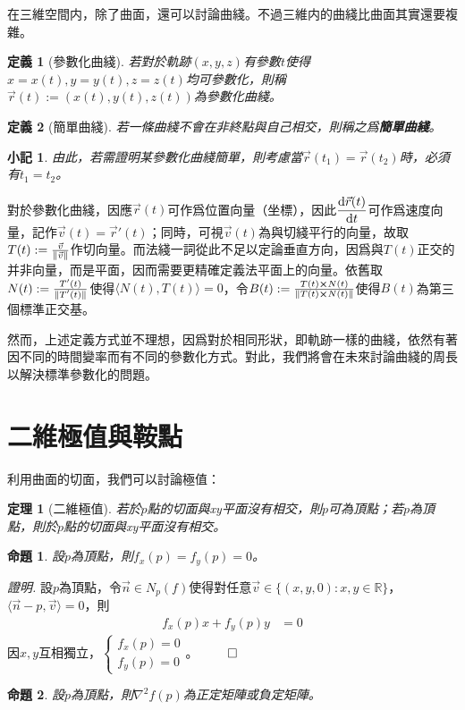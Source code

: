 \documentclass[12pt]{article}
\newcommand{\innerprod}[2]{\langle{#1},{#2}\rangle}
\newtheorem{definition}{定義}
\newtheorem*{theorem}{定理}
\newtheorem*{proposition}{命題}
\newtheorem*{remark}{小記}
\renewenvironment*{proof}{\textit{證明.}}{\hfill$\qed$}
\begin{document}
    在三維空間内，除了曲面，還可以討論曲綫。不過三維内的曲綫比曲面其實還要複雜。

    \begin{definition}[參數化曲綫]
        若對於軌跡$(x,y,z)$有參數$t$使得$x=x(t),y=y(t),z=z(t)$均可參數化，則稱$\vec{r}(t):=(x(t),y(t),z(t))$為參數化曲綫。
    \end{definition}

    \begin{definition}[簡單曲綫]
        若一條曲綫不會在非終點與自己相交，則稱之爲\textbf{簡單曲綫}。
    \end{definition}

    \begin{remark}
        由此，若需證明某參數化曲綫簡單，則考慮當$\vec{r}(t_1)=\vec{r}(t_2)$時，必須有$t_1=t_2$。
    \end{remark}

    對於參數化曲綫，因應$\vec{r}(t)$可作爲位置向量（坐標），因此$\displaystyle \derivative{\vec{r}(t)}{t}$可作爲速度向量，記作$\vec{v}(t)=\vec{r}'(t)$；同時，可視$\vec{v}(t)$為與切綫平行的向量，故取$T(t):=\frac{\vec{v}}{\norm*{\vec{v}}}$作切向量。而法綫一詞從此不足以定論垂直方向，因爲與$T(t)$正交的并非向量，而是平面，因而需要更精確定義法平面上的向量。依舊取$N(t):=\frac{T'(t)}{\norm*{T'(t)}}$使得$\innerprod{N(t)}{T(t)}=0$，令$B(t):=\frac{T(t)\cross N(t)}{\norm*{T(t)\cross N(t)}}$使得$B(t)$為第三個標準正交基。

    然而，上述定義方式並不理想，因爲對於相同形狀，即軌跡一樣的曲綫，依然有著因不同的時間變率而有不同的參數化方式。對此，我們將會在未來討論曲綫的周長以解決標準參數化的問題。

    \section*{二維極值與鞍點}

    利用曲面的切面，我們可以討論極值：

    \begin{theorem}[二維極值]
        若於$p$點的切面與xy平面沒有相交，則$p$可為頂點；若$p$為頂點，則於$p$點的切面與xy平面沒有相交。
    \end{theorem}

    \begin{proposition}
        設$p$為頂點，則$f_x(p)=f_y(p)=0$。
    \end{proposition}

    \begin{proof}
        設$p$為頂點，令$\vec{n}\in N_p(f)$使得對任意$\vec{v}\in\{(x,y,0):x,y\in\mathbb{R}\}$，$\innerprod{\vec{n}-p}{\vec{v}}=0$，則\begin{align*}
            f_x(p)x+f_y(p)y&=0
        \end{align*}
        因$x,y$互相獨立，$\begin{cases}
            f_x(p)=0\\f_y(p)=0
        \end{cases}$。
    \end{proof}

    \begin{proposition}
        設$p$為頂點，則$\nabla^2 f(p)$為正定矩陣或負定矩陣。
    \end{proposition}
\end{document}
